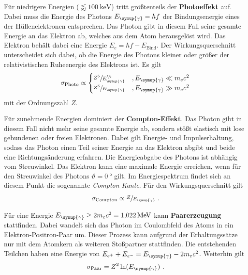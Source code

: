     \label{sec:theorie:photoeffekt}
    Für niedrigere Energien ($\lessapprox \SI{100}{\kilo\electronvolt}$) tritt größtenteils der \textbf{Photoeffekt} auf.
    Dabei muss die Energie des Photons $E_{\symup{\gamma}} = hf$ der Bindungsenergie eines der Hüllenelektronen entsprechen.
    Das Photon gibt in diesem Fall seine gesamte Energie an das Elektron ab,
    welches aus dem Atom herausgelöst wird.
    Das Elektron behält dabei eine Energie $E_{e} = hf - E_\text{Bind}$.
    Der Wirkungsquerschnitt unterscheidet sich dabei,
    ob die Energie des Photons kleiner oder größer der relativistischen Ruheenergie des Elektrons ist.
    Es gilt
    \begin{equation*}
        \sigma_\text{Photo} \propto
        \begin{cases}
            \sfrac{Z^5}{E^{\sfrac{7}{2}}_{\symup{\gamma}}} & , E_{\symup{\gamma}} \ll m_{e} c^2 \\
            \sfrac{Z^5}{E_{\symup{\gamma}}} & , E_{\symup{\gamma}} \gg m_{e} c^2 \\
        \end{cases}
    \end{equation*}
    mit der Ordnungszahl $Z$.


    \label{sec:theorie:comptoneffekt}
    Für zunehmende Energien dominiert der \textbf{Compton-Effekt}.
    Das Photon gibt in diesem Fall nicht mehr seine gesamte Energie ab,
    sondern stößt elastisch mit lose gebundenen oder freien Elektronen.
    Dabei gilt Energie- und Impulserhaltung,
    sodass das Photon einen Teil seiner Energie an das Elektron abgibt und beide eine Richtungsänderung erfahren.
    Die Energieabgabe des Photons ist abhängig vom Streuwinkel.
    Das Elektron kann eine maximale Energie erreichen,
    wenn für den Streuwinkel des Photons $\vartheta = \SI{0}{\degree}$ gilt.
    Im Energiespektrum findet sich an diesem Punkt die sogenannte \textit{Compton-Kante}.
    Für den Wirkungsquerschnitt gilt
    \begin{equation*}
        \sigma_\text{Compton} \propto \sfrac{Z}{E_{\symup{\gamma}}} \ .
    \end{equation*}


    \label{sec:theorie:paarerzeugung}
    Für eine Energie $E_{\symup{\gamma}} \geq 2m_{e}c^2 = \SI{1.022}{\mega\eV}$ kann \textbf{Paarerzeugung} stattfinden.
    Dabei wandelt sich das Photon im Coulombfeld des Atoms in ein Elektron-Positron-Paar um.
    Dieser Prozess kann aufgrund der Erhaltungssätze nur mit dem Atomkern als weiteren Stoßpartner stattfinden.
    Die entstehenden Teilchen haben eine Energie von $E_{e^{+}} + E_{e^{-}} = E_{\symup{\gamma}} - 2m_{e}c^2$.
    Weiterhin gilt
    \begin{equation*}
        \sigma_\text{Paar} = Z^2 \ln(E_{\symup{\gamma}}) \ .
    \end{equation*}

